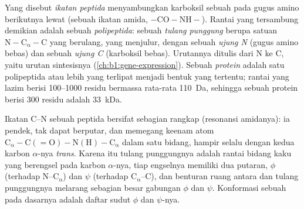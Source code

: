 \begin{definition}\label{def:b1:proteins:peptide}
Yang disebut \emph{ikatan peptida} menyambungkan
karboksil sebuah  pada gugus amino  berikutnya lewat
 (sebuah ikatan amida, $\mathrm{-CO{-}NH-}$). Rantai  yang tersambung demikian adalah sebuah
\emph{polipeptida}: sebuah \emph{tulang punggung}
berupa satuan $\mathrm{N{-}C_\alpha{-}C}$ yang berulang, yang  menjulur, dengan sebuah \emph{ujung N} (gugus amino bebas)
dan sebuah \emph{ujung C} (karboksil bebas). Urutannya ditulis dari N ke
C, yaitu urutan sintesisnya (\cref{ch:b1:gene-expression}). Sebuah
\emph{protein} adalah satu polipeptida atau lebih yang
terlipat menjadi bentuk yang tertentu; rantai yang lazim berisi
\qtyrange{100}{1000}{} residu bermassa rata-rata \qty{110}{Da},
sehingga sebuah protein berisi \qty{300}{} residu adalah \qty{33}{kDa}.
\end{definition}

\begin{proposition}\label{prop:b1:proteins:geometry}
Ikatan C--N sebuah peptida bersifat sebagian rangkap (resonansi
amidanya): ia pendek, tak dapat berputar, dan memegang keenam atom
$\mathrm{C_\alpha{-}C(=O){-}N(H){-}C_\alpha}$ dalam satu bidang, hampir
selalu dengan kedua karbon $\alpha$-nya \emph{trans}. Karena itu tulang
punggungnya adalah rantai bidang kaku yang berengsel pada karbon
$\alpha$-nya, tiap engselnya memiliki dua putaran, $\phi$ (terhadap
N--$\mathrm{C_\alpha}$) dan $\psi$ (terhadap $\mathrm{C_\alpha}$--C),
dan benturan ruang antara  dan tulang punggungnya
melarang sebagian besar gabungan $\phi$ dan $\psi$. Konformasi sebuah
 pada dasarnya adalah daftar sudut $\phi$ dan $\psi$-nya.
\end{proposition}

